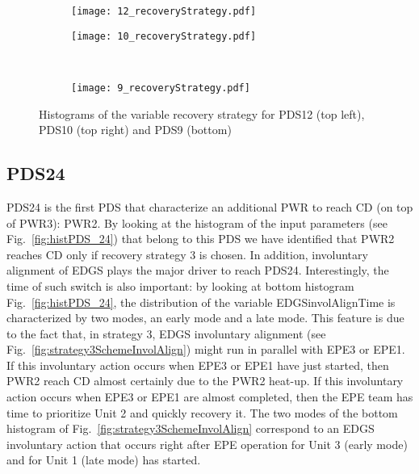 \begin{figure}
  \begin{subfigure}{.5\linewidth}
    \centering
    \texttt{[image: 12\_recoveryStrategy.pdf]}
  \end{subfigure}%
  \begin{subfigure}{.5\linewidth}
    \centering
    \texttt{[image: 10\_recoveryStrategy.pdf]}
  \end{subfigure}\\[1ex]
  \begin{subfigure}{\linewidth}
    \centering
    \texttt{[image: 9\_recoveryStrategy.pdf]}
  \end{subfigure}
  \caption{Histograms of the variable recovery strategy for PDS12 (top left), PDS10 (top right) and PDS9 (bottom)}
  \label{fig:histPDS_12_10_9_recoveryStrategy}
\end{figure}

\subsection{PDS24}
PDS24 is the first PDS that characterize an additional PWR to reach CD (on top of PWR3): PWR2. By looking at the
histogram of the input parameters (see Fig.~\ref{fig:histPDS_24}) that belong to this PDS we have identified 
that PWR2 reaches CD only if recovery strategy 3 is chosen. 
In addition, involuntary alignment of EDGS plays the major driver to reach PDS24. Interestingly, the time of such 
switch is also important: by looking at bottom histogram Fig.~\ref{fig:histPDS_24}, the distribution of the 
variable EDGSinvolAlignTime is characterized by two modes, an early mode and a late mode.
This feature is due to the fact that, in strategy 3, EDGS involuntary alignment 
(see Fig.~\ref{fig:strategy3SchemeInvolAlign}) might run in parallel with EPE3 or EPE1.
If this involuntary action occurs when EPE3 or EPE1 have just started, then PWR2 reach CD almost certainly due to
the PWR2 heat-up. If this involuntary action occurs when EPE3 or EPE1 are almost completed, then the EPE team
has time to prioritize Unit 2 and quickly recovery it.
The two modes of the bottom histogram of Fig.~\ref{fig:strategy3SchemeInvolAlign} correspond to an EDGS 
involuntary action that occurs right after EPE operation for Unit 3 (early mode) and for Unit 1 (late mode) has 
started.

